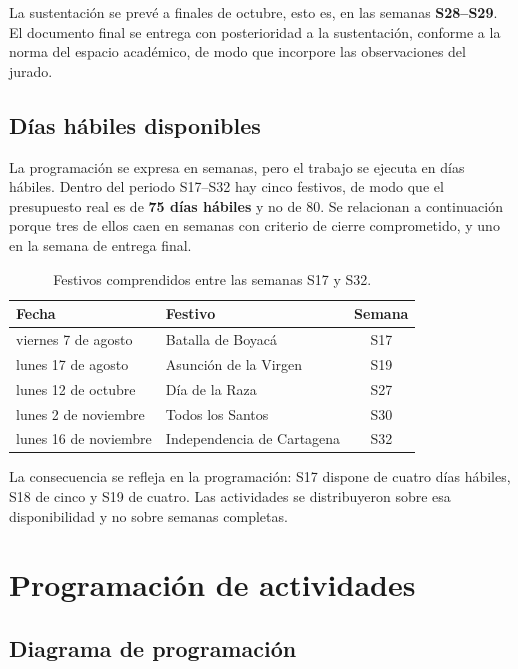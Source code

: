 \documentclass[12pt,letterpaper]{article}
\begin{document}
La sustentación se prevé a finales de octubre, esto es, en las semanas \textbf{S28--S29}. El documento final se entrega con posterioridad a la sustentación, conforme a la norma del espacio académico, de modo que incorpore las observaciones del jurado.

\subsection{Días hábiles disponibles}

La programación se expresa en semanas, pero el trabajo se ejecuta en días hábiles. Dentro del periodo S17--S32 hay cinco festivos, de modo que el presupuesto real es de \textbf{75 días hábiles} y no de 80. Se relacionan a continuación porque tres de ellos caen en semanas con criterio de cierre comprometido, y uno en la semana de entrega final.

\begin{table}[H]
    \centering
    \caption{Festivos comprendidos entre las semanas S17 y S32.}
    \label{tab:festivos}
    \begin{tabular}{@{}llc@{}}
        \toprule
        \textbf{Fecha} & \textbf{Festivo} & \textbf{Semana} \\ \midrule
        viernes 7 de agosto    & Batalla de Boyacá                & S17 \\
        lunes 17 de agosto     & Asunción de la Virgen            & S19 \\
        lunes 12 de octubre    & Día de la Raza                   & S27 \\
        lunes 2 de noviembre   & Todos los Santos                 & S30 \\
        lunes 16 de noviembre  & Independencia de Cartagena       & S32 \\ \bottomrule
    \end{tabular}
\end{table}

La consecuencia se refleja en la programación: S17 dispone de cuatro días hábiles, S18 de cinco y S19 de cuatro. Las actividades se distribuyeron sobre esa disponibilidad y no sobre semanas completas.

\section{Programación de actividades}

\subsection{Diagrama de programación}
\end{document}
